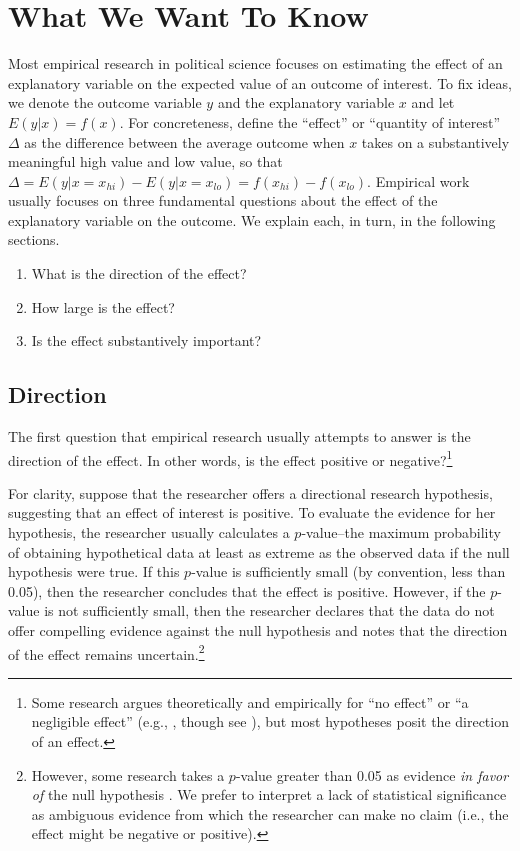 \documentclass[12pt]{article}
\begin{document}
\section*{What We Want To Know}

Most empirical research in political science focuses on estimating the effect of an explanatory variable on the expected value of an outcome of interest. To fix ideas, we denote the outcome variable $y$ and the explanatory variable $x$ and let $E(y | x) = f(x)$. For concreteness, define the ``effect'' or ``quantity of interest'' $\Delta$ as the difference between the average outcome when $x$ takes on a substantively meaningful high value and low value, so that $\Delta = E(y | x = x_{hi}) - E(y | x = x_{lo}) = f(x_{hi}) - f(x_{lo})$. Empirical work usually focuses on three fundamental questions about the effect of the explanatory variable on the outcome. We explain each, in turn, in the following sections.

\begin{enumerate}
\item What is the direction of the effect?
\item How large is the effect?
\item Is the effect substantively important?
\end{enumerate}

\subsection*{Direction}

The first question that empirical research usually attempts to answer is the direction of the effect. In other words, is the effect positive or negative?\footnote{Some research argues theoretically and empirically for ``no effect'' or ``a negligible effect'' (e.g., \citealt{KamPalmer2008}, though see \citealt{Rainey2014a}), but most hypotheses posit the direction of an effect.} 

For clarity, suppose that the researcher offers a directional research hypothesis, suggesting that an effect of interest is positive. To evaluate the evidence for her hypothesis, the researcher usually calculates a $p$-value--the maximum probability of obtaining hypothetical data at least as extreme as the observed data if the null hypothesis were true. If this $p$-value is sufficiently small (by convention, less than 0.05), then the researcher concludes that the effect is positive. However, if the $p$-value is not sufficiently small, then the researcher declares that the data do not offer compelling evidence against the null hypothesis and notes that the direction of the effect remains uncertain.\footnote{However, some research takes a $p$-value greater than 0.05 as evidence \textit{in favor of} the null hypothesis \citep{Rainey2014a}. We prefer to interpret a lack of statistical significance as ambiguous evidence from which the researcher can make no claim (i.e., the effect might be negative or positive).}
\end{document}
